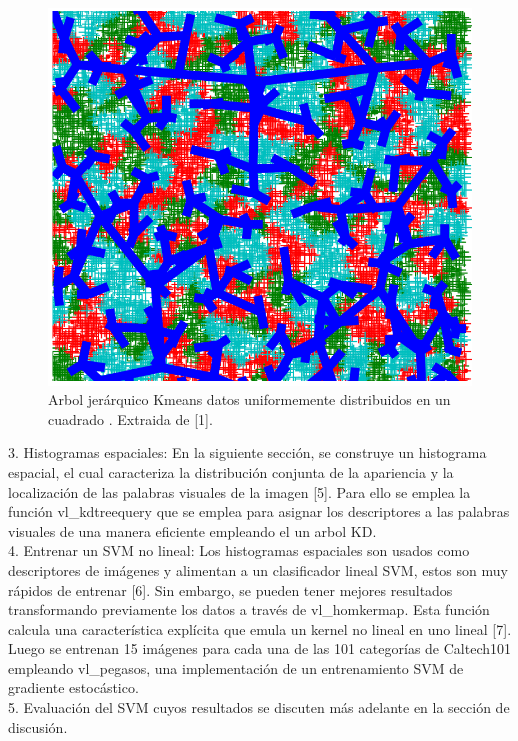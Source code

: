 \documentclass[10pt,twocolumn,letterpaper]{article}
\begin{document}
\begin{figure}[t]
\begin{center}
   \includegraphics[width=0.9\linewidth]{f1_kmeans.png}
\end{center}
   \caption{Arbol jerárquico Kmeans datos uniformemente distribuidos en un cuadrado . Extraida de [1].}
\label{fig:seg}
\end{figure}

3. Histogramas espaciales: En la siguiente sección, se construye un histograma espacial, el cual caracteriza la distribución conjunta de la apariencia y la localización de las palabras visuales de la imagen [5]. Para ello se emplea la función vl\_kdtreequery que se emplea para asignar los descriptores a las palabras visuales de una manera eficiente empleando el un arbol KD.\\

4. Entrenar un SVM no lineal: Los histogramas espaciales son usados como descriptores de imágenes y alimentan a un clasificador lineal SVM, estos son muy rápidos de entrenar [6]. Sin embargo, se pueden tener mejores resultados transformando previamente los datos a través de vl\_homkermap. Esta función calcula una característica explícita que emula un kernel no lineal en uno lineal [7]. Luego se entrenan 15 imágenes para cada una de las 101 categorías de Caltech101 empleando vl\_pegasos, una implementación de un entrenamiento SVM de gradiente estocástico.\\

5. Evaluación del SVM cuyos resultados se discuten más adelante en la sección de discusión.
\end{document}
